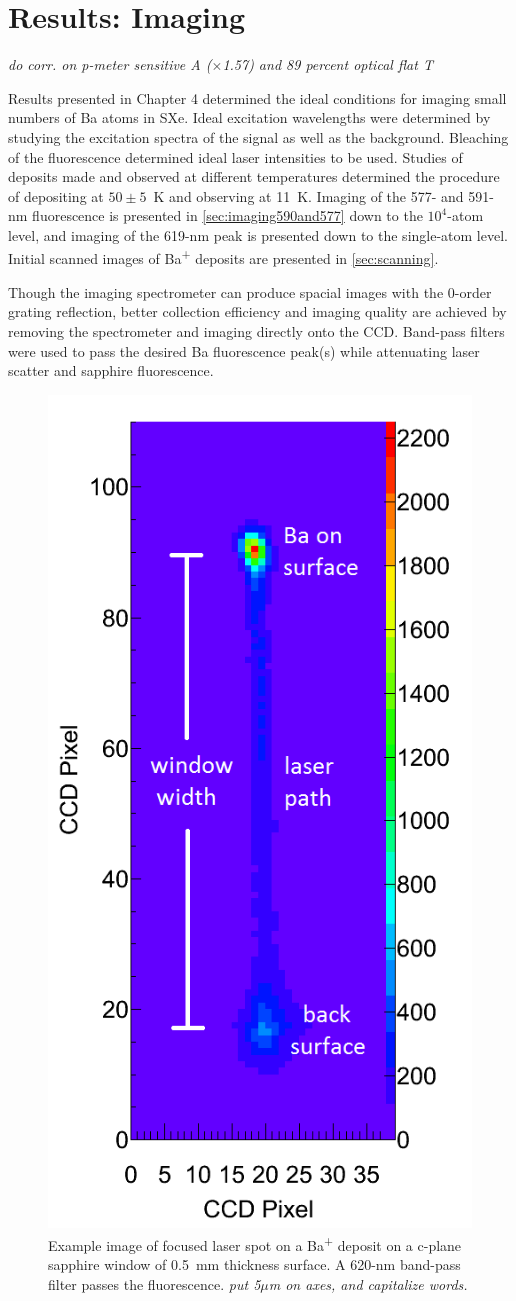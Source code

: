 \chapter{Results: Imaging}
\label{imaging}

\emph{\color{red}do corr. on p-meter sensitive A ($\times$1.57) and 89 percent optical flat T}

Results presented in Chapter 4 determined the ideal conditions for imaging small numbers of Ba atoms in SXe.  Ideal excitation wavelengths were determined by studying the excitation spectra of the signal as well as the background.  Bleaching of the fluorescence determined ideal laser intensities to be used.  Studies of deposits made and observed at different temperatures determined the procedure of depositing at $50 \pm 5$~K and observing at 11~K.  Imaging of the 577- and 591-nm fluorescence is presented in \ref{sec:imaging590and577} down to the $10^{4}$-atom level, and imaging of the 619-nm peak is presented down to the single-atom level.  Initial scanned images of Ba\textsuperscript{+} deposits are presented in \ref{sec:scanning}.

Though the imaging spectrometer can produce spacial images with the 0-order grating reflection, better collection efficiency and imaging quality are achieved by removing the spectrometer and imaging directly onto the CCD.  Band-pass filters were used to pass the desired Ba fluorescence peak(s) while attenuating laser scatter and sapphire fluorescence.

\begin{figure} %
        \centering
                \includegraphics[width=.4\textwidth]{figures/raw_14-atom_labels_from_paper_1f.png}
                \caption{Example image of focused laser spot on a Ba\textsuperscript{+} deposit on a c-plane sapphire window of 0.5~mm thickness surface.  A 620-nm band-pass filter passes the fluorescence. \emph{\color{gray}put 5$\mu$m on axes, and capitalize words.}}
\label{fig:imageexamp}
\end{figure}

